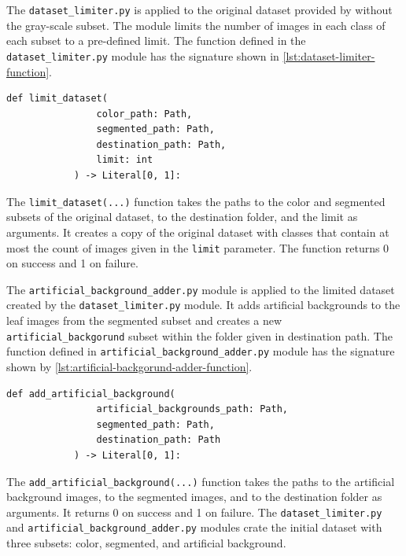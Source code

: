 \documentclass{BachelorBUI}
\begin{document}
        The \verb|dataset_limiter.py| is applied to the original dataset provided by \textcite{Mohanty:2016} without the gray-scale subset. The module limits the number of images in each class of each subset to a pre-defined limit. The function defined in the \verb|dataset_limiter.py| module has the signature shown in \autoref{lst:dataset-limiter-function}.
        \begin{lstlisting}[caption={\centering Signature of the function defined in dataset\_limiter.py}, label={lst:dataset-limiter-function}, captionpos=b]
            def limit_dataset(
                color_path: Path,
                segmented_path: Path,
                destination_path: Path,
                limit: int
            ) -> Literal[0, 1]:
        \end{lstlisting}
        The \verb|limit_dataset(...)| function takes the paths to the color and segmented subsets of the original dataset, to the destination folder, and the limit as arguments. It creates a copy of the original dataset with classes that contain at most the count of images given in the \verb|limit| parameter. The function returns 0 on success and 1 on failure.

        The \verb|artificial_background_adder.py| module is applied to the limited dataset created by the \verb|dataset_limiter.py| module. It adds artificial backgrounds to the leaf images from the segmented subset and creates a new \verb|artificial_backgorund| subset within the folder given in destination path. The function defined in \verb|artificial_background_adder.py| module has the signature shown by \autoref{lst:artificial-backgorund-adder-function}.
        \begin{lstlisting}[caption={\centering Signature of the function defined in artificial\_background\_adder.py}, label={lst:artificial-backgorund-adder-function}, captionpos=b]
            def add_artificial_background(
                artificial_backgrounds_path: Path,
                segmented_path: Path,
                destination_path: Path
            ) -> Literal[0, 1]:
        \end{lstlisting}
        The \verb|add_artificial_background(...)| function takes the paths to the artificial background images, to the segmented images, and to the destination folder as arguments. It returns 0 on success and 1 on failure. The \verb|dataset_limiter.py| and \verb|artificial_background_adder.py| modules crate the initial dataset with three subsets: color, segmented, and artificial background.
\end{document}
